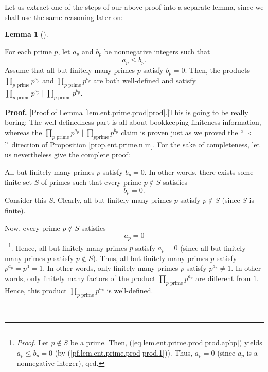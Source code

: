 \documentclass[numbers=enddot,12pt,final,onecolumn,notitlepage]{scrartcl}%
\numberwithin{exer}{subsection}
\theoremstyle{definition}
\newtheorem{lem}[theo]{Lemma}
\newenvironment{lemma}[1][]
{\begin{lem}[#1]\begin{leftbar}}
{\end{leftbar}\end{lem}}
\newenvironment{fineprint}{\begin{small}}{\end{small}}
\newenvironment{proof}[1][Proof]{\noindent\textbf{#1.} }{\ \rule{0.5em}{0.5em}}
\let\prodnonlimits\prod
\renewcommand{\prod}{\prodnonlimits\limits}
\begin{document}
Let us extract one of the steps of our above proof into a separate lemma,
since we shall use the same reasoning later on:

\begin{lemma}
\label{lem.ent.prime.prod|prod}For each prime $p$, let $a_{p}$ and $b_{p}$ be
nonnegative integers such that
\begin{equation}
a_{p}\leq b_{p}. \label{eq.lem.ent.prime.prod|prod.apbp}%
\end{equation}
Assume that all but finitely many primes $p$ satisfy $b_{p}=0$. Then, the
products $\prod_{p\text{ prime}}p^{a_{p}}$ and $\prod_{p\text{ prime}}%
p^{b_{p}}$ are both well-defined and satisfy $\prod_{p\text{ prime}}p^{a_{p}%
}\mid\prod_{p\text{ prime}}p^{b_{p}}$.
\end{lemma}

\begin{proof}
[Proof of Lemma \ref{lem.ent.prime.prod|prod}.]This is going to be really
boring: The well-definedness part is all about bookkeeping finiteness
information, whereas the $\prod_{p\text{ prime}}p^{a_{p}}\mid\prod_{p\text{
prime}}p^{b_{p}}$ claim is proven just as we proved the \textquotedblleft%
$\Longleftarrow$\textquotedblright\ direction of Proposition
\ref{prop.ent.prime.n|m}. For the sake of completeness, let us nevertheless
give the complete proof:

\begin{fineprint}
All but finitely many primes $p$ satisfy $b_{p}=0$. In other words, there
exists some finite set $S$ of primes such that every prime $p\notin S$
satisfies
\begin{equation}
b_{p}=0. \label{pf.lem.ent.prime.prod|prod.1}%
\end{equation}
Consider this $S$. Clearly, all but finitely many primes $p$ satisfy $p\notin
S$ (since $S$ is finite).

Now, every prime $p\notin S$ satisfies
\begin{equation}
a_{p}=0 \label{pf.lem.ent.prime.prod|prod.2}%
\end{equation}
\ \footnote{\textit{Proof.} Let $p\notin S$ be a prime. Then,
(\ref{eq.lem.ent.prime.prod|prod.apbp}) yields $a_{p}\leq b_{p}=0$ (by
(\ref{pf.lem.ent.prime.prod|prod.1})). Thus, $a_{p}=0$ (since $a_{p}$ is a
nonnegative integer), qed.}. Hence, all but finitely many primes $p$ satisfy
$a_{p}=0$ (since all but finitely many primes $p$ satisfy $p\notin S$). Thus,
all but finitely many primes $p$ satisfy $p^{a_{p}}=p^{0}=1$. In other words,
only finitely many primes $p$ satisfy $p^{a_{p}}\neq1$. In other words, only
finitely many factors of the product $\prod_{p\text{ prime}}p^{a_{p}}$ are
different from $1$. Hence, this product $\prod_{p\text{ prime}}p^{a_{p}}$ is well-defined.


\end{fineprint}
\end{proof}
\end{document}
